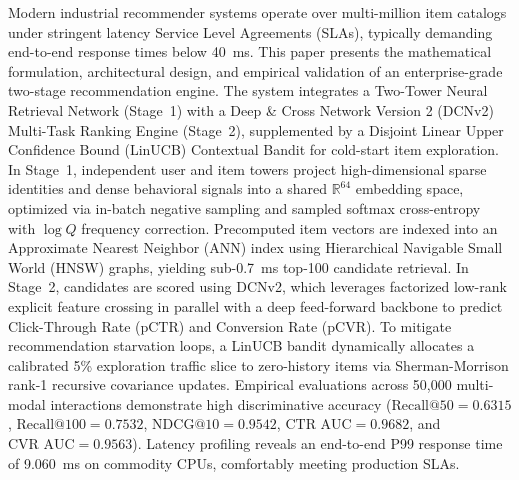 Modern industrial recommender systems operate over multi-million item catalogs under stringent latency Service Level Agreements (SLAs), typically demanding end-to-end response times below 40~ms. This paper presents the mathematical formulation, architectural design, and empirical validation of an enterprise-grade two-stage recommendation engine. The system integrates a Two-Tower Neural Retrieval Network (Stage~1) with a Deep \& Cross Network Version 2 (DCNv2) Multi-Task Ranking Engine (Stage~2), supplemented by a Disjoint Linear Upper Confidence Bound (LinUCB) Contextual Bandit for cold-start item exploration. In Stage~1, independent user and item towers project high-dimensional sparse identities and dense behavioral signals into a shared $\mathbb{R}^{64}$ embedding space, optimized via in-batch negative sampling and sampled softmax cross-entropy with $\log Q$ frequency correction. Precomputed item vectors are indexed into an Approximate Nearest Neighbor (ANN) index using Hierarchical Navigable Small World (HNSW) graphs, yielding sub-0.7~ms top-100 candidate retrieval. In Stage~2, candidates are scored using DCNv2, which leverages factorized low-rank explicit feature crossing in parallel with a deep feed-forward backbone to predict Click-Through Rate ($\text{pCTR}$) and Conversion Rate ($\text{pCVR}$). To mitigate recommendation starvation loops, a LinUCB bandit dynamically allocates a calibrated 5\% exploration traffic slice to zero-history items via Sherman-Morrison rank-1 recursive covariance updates. Empirical evaluations across 50,000 multi-modal interactions demonstrate high discriminative accuracy ($\text{Recall@50}=0.6315$, $\text{Recall@100}=0.7532$, $\text{NDCG@10}=0.9542$, $\text{CTR AUC}=0.9682$, and $\text{CVR AUC}=0.9563$). Latency profiling reveals an end-to-end P99 response time of 9.060~ms on commodity CPUs, comfortably meeting production SLAs.
